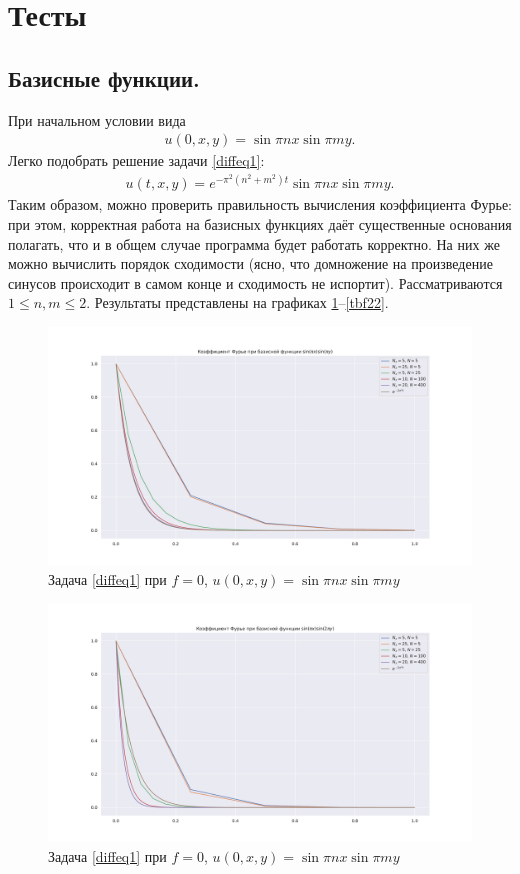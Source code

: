 \documentclass[14pt,a4paper]{extarticle}
\newcommand{\1}{\mathbbm{1}}
\begin{document}
\section{Тесты}
\subsection{Базисные функции.}
При начальном условии вида
  \begin{align*}
     u(0, x, y) = \sin \pi n x \sin \pi m y.
 \end{align*}
 Легко подобрать решение задачи \ref{diffeq1}:
  \begin{align*}
     u(t, x, y) = e^{-\pi^2 (n^2 + m^2)t} \sin \pi n x \sin \pi m y.
 \end{align*}
 Таким образом, можно проверить правильность вычисления коэффициента Фурье: при этом, корректная работа на базисных функциях даёт существенные основания полагать, 
 что и в общем случае программа будет работать корректно. На них же можно вычислить порядок сходимости 
 (ясно, что домножение на произведение синусов происходит в самом конце и сходимость не испортит). Рассматриваются $1 \leq n, m \leq 2$. Результаты представлены 
 на графиках \ref{tbf11}--\ref{tbf22}.
 \begin{figure}
    \centering
    \includegraphics[scale=0.4]{figs/11bf_test.pdf}
    \caption{Задача \ref{diffeq1} при $f = 0$, $u(0, x, y) = \sin \pi n x \sin \pi m y$ }
    \label{tbf11}
\end{figure}
\begin{figure}
    \centering
    \includegraphics[scale=0.4]{figs/12bf_test.pdf}
    \caption{Задача \ref{diffeq1} при $f = 0$, $u(0, x, y) = \sin \pi n x \sin \pi m y$}
    \label{tbf12}
\end{figure}
\end{document}
